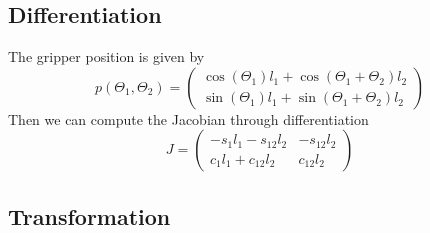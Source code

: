 \documentclass[10pt,a4paper]{article}
\begin{document}
\subsection*{Differentiation}

The gripper position is given by
\begin{equation*}
  p(\Theta_{1}, \Theta_{2}) = \begin{pmatrix}
    \cos(\Theta_{1})l_{1} + \cos(\Theta_{1} + \Theta_{2})l_{2}\\
    \sin(\Theta_{1})l_{1} + \sin(\Theta_{1} + \Theta_{2})l_{2}
  \end{pmatrix}
\end{equation*}
Then we can compute the Jacobian through differentiation
\begin{equation*}
  J = \begin{pmatrix}
    -s_{1}l_{1} - s_{12}l_{2} & -s_{12}l_{2}\\
    c_{1}l_{1} + c_{12}l_{2} & c_{12}l_{2}
  \end{pmatrix}
\end{equation*}

\subsection*{Transformation}
\end{document}
